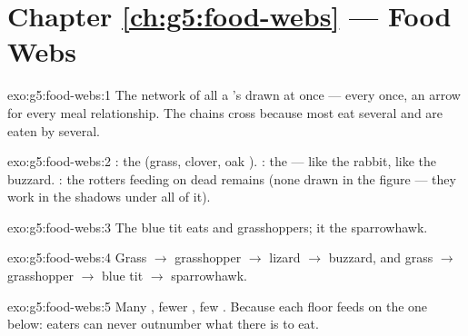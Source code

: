 \section*{Chapter \ref{ch:g5:food-webs} --- Food Webs}

\begin{solution}{exo:g5:food-webs:1}
The network of all a 's  drawn at once ---
every  once, an arrow for every meal relationship. The
chains cross because most  eat several  and are
eaten by several.
\end{solution}

\begin{solution}{exo:g5:food-webs:2}
: the  (grass, clover, oak ). :
the  ---  like the rabbit,  like
the buzzard. : the rotters feeding on dead
remains (none drawn in the figure --- they work in the
shadows under all of it).
\end{solution}

\begin{solution}{exo:g5:food-webs:3}
The blue tit eats  and grasshoppers; it  the sparrowhawk.
\end{solution}

\begin{solution}{exo:g5:food-webs:4}
Grass $\rightarrow$ grasshopper $\rightarrow$ lizard
$\rightarrow$ buzzard, and grass $\rightarrow$ grasshopper
$\rightarrow$ blue tit $\rightarrow$ sparrowhawk.
\end{solution}

\begin{solution}{exo:g5:food-webs:5}
Many , fewer , few . Because
each floor feeds on the one below: eaters can never outnumber
what there is to eat.
\end{solution}

